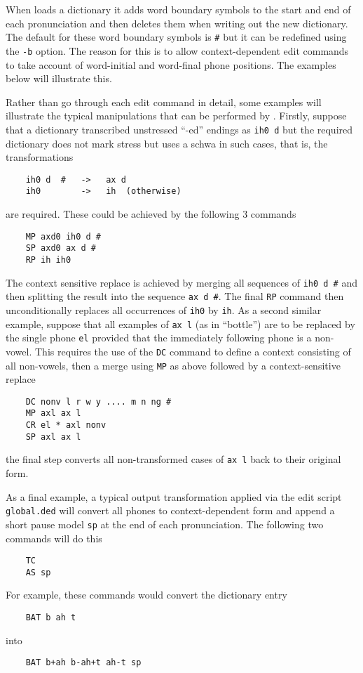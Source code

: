When  loads a dictionary it adds word boundary symbols to
the start and end of each pronunciation and then deletes them when
writing out the new dictionary.  The default for these word boundary
symbols is \texttt{\#} but it can be redefined using the \texttt{-b}
option.  The reason for this is to allow context-dependent edit commands 
to take account of word-initial and word-final phone positions.  
The examples below will illustrate this.

Rather than go through each  edit command in detail, some examples
will illustrate the typical manipulations that can be performed
by .  Firstly, suppose that a dictionary transcribed
unstressed ``-ed'' endings as \texttt{ih0 d}
but the required dictionary
does not mark stress but uses a schwa in such cases, that is,
the transformations
\begin{verbatim}
    ih0 d  #   ->   ax d
    ih0        ->   ih  (otherwise)
\end{verbatim}
are required.
These could be achieved by the following 3 commands
\begin{verbatim}
    MP axd0 ih0 d #
    SP axd0 ax d #
    RP ih ih0
\end{verbatim}
The context sensitive replace is achieved by merging all sequences
of \texttt{ih0 d \#} and then splitting the result into the sequence
\texttt{ax d \#}.  The final \texttt{RP} command then unconditionally
replaces all occurrences of \texttt{ih0} by \texttt{ih}.
As a second similar example, suppose that all examples of \texttt{ax l}
(as in ``bottle'') are to be replaced by the single phone \texttt{el}
provided that the immediately following phone is a non-vowel.
This requires the use of the \texttt{DC} command to define a
context consisting of all non-vowels, then a merge using  \texttt{MP}
as above followed by a context-sensitive replace
\begin{verbatim}
    DC nonv l r w y .... m n ng #
    MP axl ax l
    CR el * axl nonv
    SP axl ax l
\end{verbatim}
the final step converts all non-transformed cases of \texttt{ax l}
back to their original form.

As a final example, a typical output transformation applied via
the edit script \texttt{global.ded} will convert all phones to
context-dependent form and append a short pause model \texttt{sp}
at the end of each pronunciation.  The following two commands will
do this
\begin{verbatim}
    TC
    AS sp
\end{verbatim}
For example, these commands would convert the dictionary entry
\begin{verbatim}
    BAT b ah t
\end{verbatim}
into
\begin{verbatim}
    BAT b+ah b-ah+t ah-t sp
\end{verbatim}

